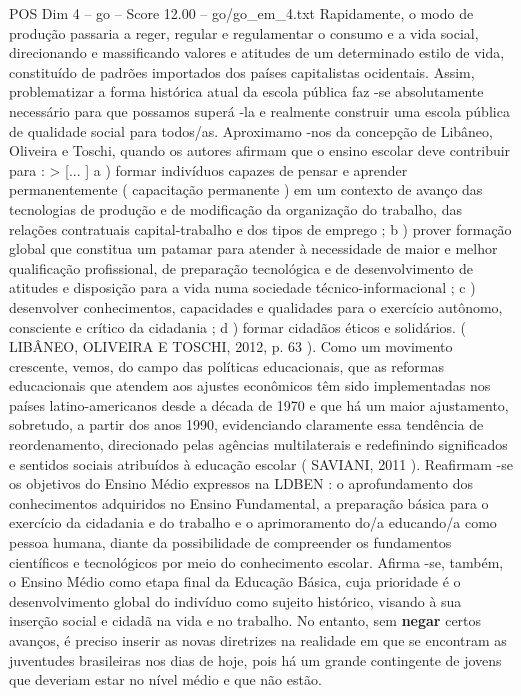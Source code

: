 \begin{textsample}{POS Dim 4 – go – Score 12.00 – go/go\_em\_4.txt}
Rapidamente, o modo de produção passaria a reger, regular e regulamentar o consumo e a vida social, direcionando e massificando valores e atitudes de um determinado estilo de vida, constituído de padrões importados dos países capitalistas ocidentais.
Assim, problematizar a forma histórica atual da escola pública faz -se absolutamente necessário para que possamos superá -la e realmente construir uma escola pública de qualidade social para todos/as.
Aproximamo -nos da concepção de Libâneo, Oliveira e Toschi, quando os autores afirmam que o ensino escolar deve contribuir para : > [... ] a ) formar indivíduos capazes de pensar e aprender permanentemente ( capacitação permanente ) em um contexto de avanço das tecnologias de produção e de modificação da organização do trabalho, das relações contratuais capital-trabalho e dos tipos de emprego ; b ) prover formação global que constitua um patamar para atender à necessidade de maior e melhor qualificação profissional, de preparação tecnológica e de desenvolvimento de atitudes e disposição para a vida numa sociedade técnico-informacional ; c ) desenvolver conhecimentos, capacidades e qualidades para o exercício autônomo, consciente e crítico da cidadania ; d ) formar cidadãos éticos e solidários. ( LIBÂNEO, OLIVEIRA E TOSCHI, 2012, p. 63 ).
Como um movimento crescente, vemos, do campo das políticas educacionais, que as reformas educacionais que atendem aos ajustes econômicos têm sido implementadas nos países latino-americanos desde a década de 1970 e que há um maior ajustamento, sobretudo, a partir dos anos 1990, evidenciando claramente essa tendência de reordenamento, direcionado pelas agências multilaterais e redefinindo significados e sentidos sociais atribuídos à educação escolar ( SAVIANI, 2011 ).
Reafirmam -se os objetivos do Ensino Médio expressos na LDBEN : o aprofundamento dos conhecimentos adquiridos no Ensino Fundamental, a preparação básica para o exercício da cidadania e do trabalho e o aprimoramento do/a educando/a como pessoa humana, diante da possibilidade de compreender os fundamentos científicos e tecnológicos por meio do conhecimento escolar.
Afirma -se, também, o Ensino Médio como etapa final da Educação Básica, cuja prioridade é o desenvolvimento global do indivíduo como sujeito histórico, visando à sua inserção social e cidadã na vida e no trabalho.
No entanto, sem \textbf{negar} certos avanços, é preciso inserir as novas diretrizes na realidade em que se encontram as juventudes brasileiras nos dias de hoje, pois há um grande contingente de jovens que deveriam estar no nível médio e que não estão.

\end{textsample}
